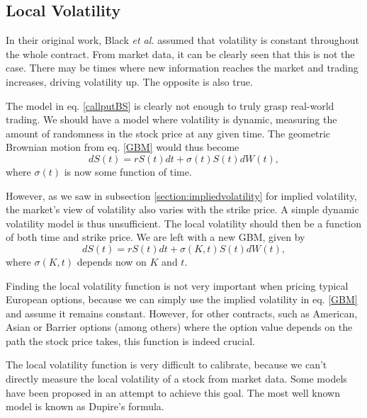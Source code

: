 \subsection{Local Volatility}
\label{subsection:localvolatility}
In their original work, Black \textit{et al.} assumed that volatility is constant throughout the whole contract. From market data, it can be clearly seen that this is not the case. There may be times where new information reaches the market and trading increases, driving volatility up. The opposite is also true.

The model in eq. \eqref{callputBS} is clearly not enough to truly grasp real-world trading. We should have a model where volatility is dynamic, measuring the amount of randomness in the stock price at any given time.
The geometric Brownian motion from eq. \ref{GBM} would thus become
\begin{equation*}
dS(t)=rS(t)dt+\sigma(t)S(t)dW(t),
\end{equation*}
\noindent where $\sigma(t)$ is now some function of time.


However, as we saw in subsection \ref{section:impliedvolatility} for implied volatility, the market's view of volatility also varies with the strike price. A simple dynamic volatility model is thus unsufficient. The local volatility should then be a function of both time and strike price. We are left with a new GBM, given by
\begin{equation}\label{GBM2}
dS(t)=rS(t)dt+\sigma(K,t)S(t)dW(t),
\end{equation}
\noindent where $\sigma(K,t)$ depends now on $K$ and $t$.


Finding the local volatility function is not very important when pricing typical European options, because we can simply use the implied volatility in eq. \ref{GBM} and assume it remains constant.
However, for other contracts, such as American, Asian or Barrier options (among others) where the option value depends on the path the stock price takes, this function is indeed crucial.

The local volatility function is very difficult to calibrate, because we can't directly measure the local volatility of a stock from market data. 
Some models have been proposed in an attempt to achieve this goal. The most well known model is known as Dupire's formula.

